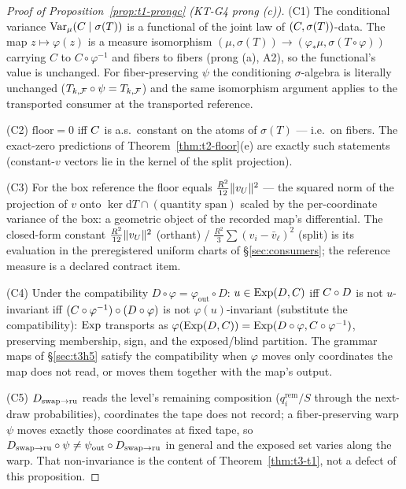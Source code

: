 
\begin{proof}[Proof of Proposition~\ref{prop:t1-prongc} (KT-G4 prong (c))]
(C1) The conditional variance
$\mathrm{Var}_{\mu}(C \mid \sigma(T))$ is a functional of the joint
law of $(C, \sigma(T))$-data. The map $z \mapsto \varphi(z)$ is a
measure isomorphism $(\mu, \sigma(T)) \to (\varphi_{*}\mu,
\sigma(T \circ \varphi))$ carrying $C$ to $C \circ \varphi^{-1}$ and
fibers to fibers (prong (a), A2), so the functional's value is unchanged.
For fiber-preserving $\psi$ the conditioning $\sigma$-algebra is literally
unchanged ($T_{k,\mathcal{F}} \circ \psi = T_{k,\mathcal{F}}$) and the same
isomorphism argument applies to the transported consumer at the
transported reference.

(C2) $\mathrm{floor} = 0$ iff $C$ is a.s.\ constant on the atoms of
$\sigma(T)$ --- i.e.\ on fibers. The exact-zero predictions of
Theorem~\ref{thm:t2-floor}(e) are exactly such statements (constant-$v$
vectors lie in the kernel of the split projection).

(C3) For the box reference the floor equals
$\tfrac{R^{2}}{12}\|v_{U}\|^{2}$ --- the squared norm of the projection of
$v$ onto $\ker \mathrm{d}T \cap (\text{quantity span})$ scaled by the
per-coordinate variance of the box: a geometric object of the recorded
map's differential. The closed-form constant
$\tfrac{R^{2}}{12}\|v_{U}\|^{2}$ (orthant) /
$\tfrac{R^{2}}{3}\sum(v_i - \bar{v}_\ell)^2$ (split) is its evaluation in
the preregistered uniform charts of \S\ref{sec:consumers}; the reference
measure is a declared contract item.

(C4) Under the compatibility $D \circ \varphi = \varphi_{\mathrm{out}}
\circ D$: $u \in \operatorname{Exp}(D, C)$ iff $C \circ D$ is not
$u$-invariant iff $(C \circ \varphi^{-1}) \circ (D \circ \varphi)$ is
not $\varphi(u)$-invariant (substitute the compatibility):
$\operatorname{Exp}$ transports as $\varphi(\operatorname{Exp}(D, C)) = \operatorname{Exp}(D \circ
\varphi, C \circ \varphi^{-1})$, preserving membership, sign, and the
exposed/blind partition. The grammar maps of \S\ref{sec:t3h5} satisfy the
compatibility when $\varphi$ moves only coordinates the map does not read,
or moves them together with the map's output.

(C5) $D_{\mathrm{swap}\to\mathrm{ru}}$ reads the level's remaining composition
($q_i^{\mathrm{rem}}/S$ through the next-draw probabilities), coordinates
the tape does not record; a fiber-preserving warp $\psi$ moves exactly
those coordinates at fixed tape, so $D_{\mathrm{swap}\to\mathrm{ru}} \circ \psi \neq
\psi_{\mathrm{out}} \circ D_{\mathrm{swap}\to\mathrm{ru}}$ in general and the exposed set varies
along the warp. That non-invariance is the content of
Theorem~\ref{thm:t3-t1}, not a defect of this proposition.
\end{proof}

